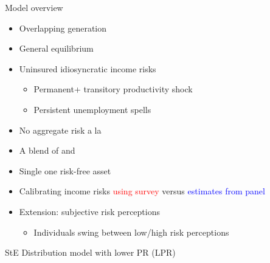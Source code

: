 \documentclass{beamer}
\begin{document}
\begin{frame}{Model overview}
	\begin{itemize}
		\item Overlapping generation 
		\item General equilibrium 

		\item Uninsured idiosyncratic income risks
		\begin{itemize}
		\item Permanent+ transitory productivity shock
		\item Persistent unemployment spells
		\end{itemize}
	\item No aggregate risk a la \cite{krusell1998income} 
		\item A blend of \cite{huggett1996wealth} and \cite{carroll1997buffer}
		\item Single one risk-free asset
	\item Calibrating income risks \textcolor{red}{using survey} versus \textcolor{blue}{estimates from panel} 
	\item Extension: subjective risk perceptions 
	\begin{itemize}
		\item Individuals swing between low/high risk perceptions
	\end{itemize}

	\end{itemize}
\end{frame}


\begin{frame}{StE Distribution model with lower PR (LPR)}
	\label{StE_dist_compare}
	
	\begin{figure}[!ht]
		\begin{center}
			 \\
			 \\
		\end{center}
	\end{figure}
	\hyperlink{appendix:calibration}{}  %
\end{frame}
\end{document}
